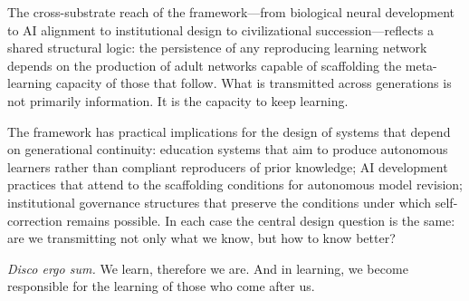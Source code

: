 \documentclass[11pt]{article}
\begin{document}
The cross-substrate reach of the framework---from biological neural development to AI
alignment to institutional design to civilizational succession---reflects a shared structural
logic: the persistence of any reproducing learning network depends on the production of adult
networks capable of scaffolding the meta-learning capacity of those that follow. What is
transmitted across generations is not primarily information. It is the capacity to keep
learning.

The framework has practical implications for the design of systems that depend on
generational continuity: education systems that aim to produce autonomous learners rather
than compliant reproducers of prior knowledge; AI development practices that attend to the
scaffolding conditions for autonomous model revision; institutional governance structures
that preserve the conditions under which self-correction remains possible. In each case the
central design question is the same: are we transmitting not only what we know, but how to
know better?

\medskip
\noindent\textit{Disco ergo sum.} We learn, therefore we are. And in learning, we become
responsible for the learning of those who come after us.
\end{document}

